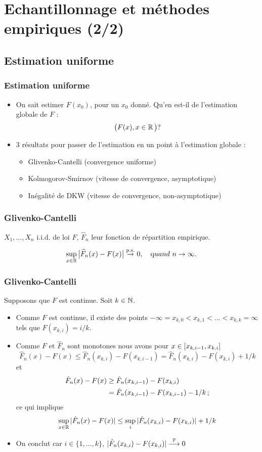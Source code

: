 \section{Echantillonnage et méthodes empiriques (2/2)}
\subsection{Estimation uniforme}
\begin{frame}
\frametitle{Estimation uniforme}
\begin{itemize}
\item On \og sait \fg{} estimer $F(x_0)$, pour un $x_0$ donné. Qu'en est-il de l'estimation \alert{globale} de $F$ :
$$\big(F(x), x \in \operatorname{{\mathbb R}}\big) ?$$
\item 3 résultats pour passer de l'estimation en un point à \alert{l'estimation globale} :
\begin{itemize}
\item Glivenko-Cantelli (convergence uniforme)
\item Kolmogorov-Smirnov (vitesse de convergence, asymptotique)
\item Inégalité de DKW (vitesse de convergence, non-asymptotique)
\end{itemize}
\end{itemize}
\end{frame}
\begin{frame}
\frametitle{Glivenko-Cantelli}
$X_1,\ldots, X_n$ i.i.d. de loi $F$, $\widehat F_n$ leur fonction de répartition empirique.
\begin{theo}
$$\sup_{x \in \operatorname{{\mathbb R}}}\big|\widehat F_n(x)-F(x)\big|
\stackrel{\mathrm{p.s.}}{\rightarrow}0, \quad {\text quand} \ n\to
\infty.$$
\end{theo}
\end{frame}
\begin{frame}
\frametitle{Glivenko-Cantelli}
Supposons que $F$ est continue. Soit $k \in \mathbb{N}$.
\begin{itemize}
\item Comme $F$ est continue, il existe des points $-\infty= x_{k,0} < x_{k,1} < \dots < x_{k,k}= \infty$ tels que $F(x_{k,i})= i /k$.
\item Comme $F$ et $\hat{F}_n$ sont \alert{monotones} nous avons pour $x \in \left[x_{k,i-1},x_{k,i}\right]$
\begin{equation*}
\hat{F}_n(x) - F(x) \leq \hat{F}_n(x_{k,i}) - F(x_{k,i-1})= \hat{F}_n(x_{k,i}) - F(x_{k,i}) + 1/k 
\end{equation*}
et
\begin{align*}
\hat{F}_n(x) - F(x) &\geq \hat{F}_n(x_{k,i-1}) - F(x_{k,i}) \\
&= \hat{F}_n(x_{k,i-1})- F(x_{k,i-1}) - 1/k \,;
\end{align*}
ce qui implique
\[
\sup_{x \in \mathbb{R}} |\hat{F}_n(x) - F(x)| \leq \sup_i |\hat{F}_n(x_{k,i}) - F(x_{k,i})| + 1/k
\]
\pause \item On conclut car $i \in \{1,\dots,k\}$, $|\hat{F}_n(x_{k,i})- F(x_{k,i})| \stackrel{\operatorname{{\mathbb P}}}{\longrightarrow} 0$
\end{itemize}
\end{frame}

